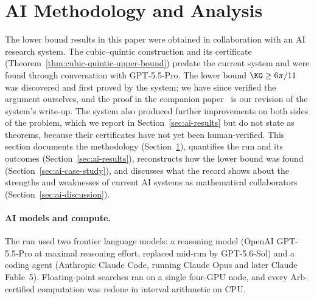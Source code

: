 
\hypersetup{
  colorlinks=true,
  linkcolor=blue!55!black,
  urlcolor=blue!55!black,
  citecolor=blue!55!black
}

\setlength{\parindent}{0pt}
\setlength{\parskip}{6pt}

\section{AI Methodology and Analysis}
\label{sec:ai-methodology}

The lower bound results in this paper were obtained in collaboration with an AI research system. The cubic--quintic
construction and its certificate (Theorem~\ref{thm:cubic-quintic-upper-bound})
predate the current system and were found through conversation with GPT-5.5-Pro. The lower bound $\KG\ge6\pi/11$ was
discovered and first proved by the system; we have since verified the
argument ourselves, and the proof in the companion paper~\cite{saha2026new} is our revision of the
system's write-up. The system also produced further improvements on both
sides of the problem, which we report in Section~\ref{sec:ai-results} but do
not state as theorems, because their certificates have not yet been human-verified. This section documents the methodology
(Section~\ref{sec:ai-methodology}), quantifies the run and its outcomes
(Section~\ref{sec:ai-results}), reconstructs how the lower bound was found
(Section~\ref{sec:ai-case-study}), and discusses what the record shows about
the strengths and weaknesses of current AI systems as mathematical
collaborators (Section~\ref{sec:ai-discussion}).


\paragraph{AI models and compute.}
The run used two frontier language models: a reasoning model (OpenAI
GPT-5.5-Pro at maximal reasoning effort, replaced mid-run by GPT-5.6-Sol)
and a coding agent (Anthropic Claude Code, running Claude Opus and later
Claude Fable~5). Floating-point searches
ran on a single four-GPU node, and every Arb-certified computation was redone in interval arithmetic on CPU.

